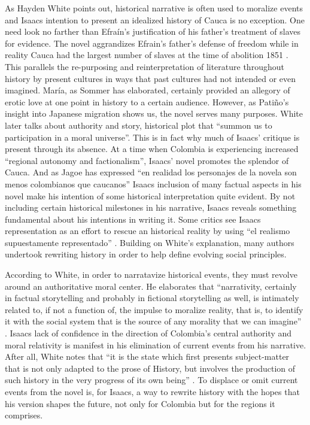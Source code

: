 \documentclass[12pt]{report}
\begin{document}
As Hayden White points out, historical narrative is often used to moralize events and Isaacs intention to present an idealized history of Cauca is no exception.
One need look no farther than Efraín's justification of his father's treatment of slaves for evidence.
The novel aggrandizes Efrain’s father’s defense of freedom while in reality Cauca had the largest number of slaves at the time of abolition 1851 \autocite[351]{Palacios2002}.
This parallels the re-purposing and reinterpretation of literature throughout history by present cultures in ways that past cultures had not intended or even imagined. 
María, as Sommer has elaborated, certainly provided an allegory of erotic love at one point in history to a certain audience. 
However, as Patiño's insight into Japanese migration shows us, the novel serves many purposes.
White later talks about authority and story, historical plot that \enquote{summon us to participation in a moral universe}. 
This is in fact why much of Isaacs' critique is present through its absence. 
At a time when Colombia is experiencing increased \enquote{regional autonomy and factionalism}, Isaacs' novel promotes the splendor of Cauca.
And as Jagoe has expressed \enquote{en realidad los personajes de la novela son menos colombianos que caucanos} \autocite[149]{Jagoe2003} 
Isaacs inclusion of many factual aspects in his novel make his intention of some historical interpretation quite evident. 
By not including certain historical milestones in his narrative, Isaacs reveals something fundamental about his intentions in writing it. 
Some critics see Isaacs representation as an effort to rescue an historical reality by using \enquote{el realismo supuestamente representado} \autocite[367]{Ortiz2007}. 
Building on White’s explanation, many authors undertook rewriting history in order to help define evolving social principles.  


According to White, in order to narratavize historical events, they must revolve around an authoritative moral center. 
He elaborates that \enquote{narrativity, certainly in factual storytelling and probably in fictional storytelling as well, is intimately related to, if not a function of, the impulse to moralize reality, that is, to identify it with the social system that is the source of any morality that we can imagine} \autocite[18]{White1980}. 
Isaacs lack of confidence in the direction of Colombia’s central authority and moral relativity is manifest in his elimination of current events from his narrative.
After all, White notes that \enquote{it is the state which first presents subject-matter that is not only adapted to the prose of History, but involves the production of such history in the very progress of its own being} \autocite[18]{White1980}.
To displace or omit current events from the novel is, for Isaacs, a way to rewrite history with the hopes that his version shapes the future, not only for Colombia but for the regions it comprises.
\end{document}
